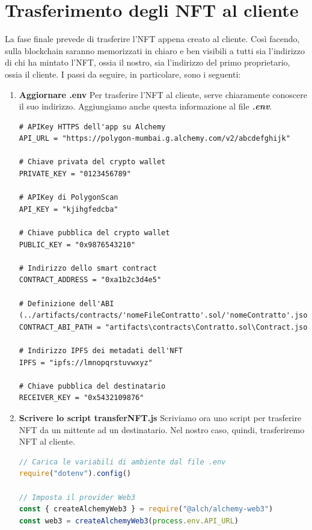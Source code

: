 \documentclass[12pt]{report}
\begin{document}
\section{Trasferimento degli NFT al cliente}
\label{sec:trasferimento}
La fase finale prevede di trasferire l'NFT appena creato al cliente. Così facendo, sulla blockchain saranno memorizzati in chiaro e ben visibili a tutti sia l'indirizzo di chi ha mintato l'NFT, ossia il nostro, sia l'indirizzo del primo proprietario, ossia il cliente. I passi da seguire, in particolare, sono i seguenti:
\begin{enumerate}[topsep=5pt, itemsep=0pt]
\item \textbf{Aggiornare .env}\newline
Per trasferire l'NFT al cliente, serve chiaramente conoscere il suo indirizzo.\newline
Aggiungiamo anche questa informazione al file \textit{\textbf{.env}}.
\begin{lstlisting}[language=HTML, numbers=none, aboveskip=2pt]
# APIKey HTTPS dell'app su Alchemy
API_URL = "https://polygon-mumbai.g.alchemy.com/v2/abcdefghijk"

# Chiave privata del crypto wallet
PRIVATE_KEY = "0123456789"

# APIKey di PolygonScan
API_KEY = "kjihgfedcba"

# Chiave pubblica del crypto wallet
PUBLIC_KEY = "0x9876543210"

# Indirizzo dello smart contract
CONTRACT_ADDRESS = "0xa1b2c3d4e5"

# Definizione dell'ABI
(../artifacts/contracts/'nomeFileContratto'.sol/'nomeContratto'.json)
CONTRACT_ABI_PATH = "artifacts\contracts\Contratto.sol\Contract.json"

# Indirizzo IPFS dei metadati dell'NFT
IPFS = "ipfs://lmnopqrstuvwxyz"

# Chiave pubblica del destinatario
RECEIVER_KEY = "0x5432109876"
\end{lstlisting}

\item \textbf{Scrivere lo script transferNFT.js}\newline
Scriviamo ora uno script per trasferire NFT da un mittente ad un destinatario. Nel nostro caso, quindi, trasferiremo NFT al cliente.
\begin{lstlisting}[language=JavaScript, aboveskip=2pt]
// Carica le variabili di ambiente dal file .env
require("dotenv").config()

// Imposta il provider Web3
const { createAlchemyWeb3 } = require("@alch/alchemy-web3")
const web3 = createAlchemyWeb3(process.env.API_URL)


\end{lstlisting}
\end{enumerate}
\end{document}
